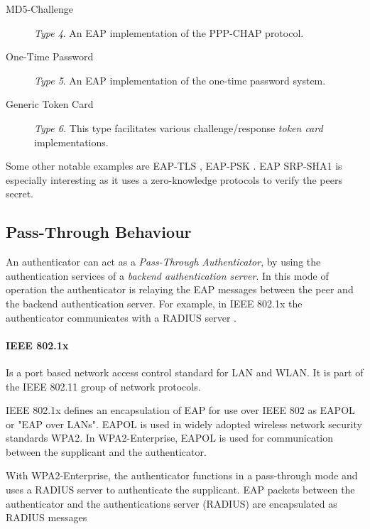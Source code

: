 \begin{description}
	\item[MD5-Challenge] \textit{Type 4}. An EAP implementation of the \cite{simon2008eap} PPP-CHAP protocol.
	\item[One-Time Password] \textit{Type 5}. An EAP implementation of the \cite{haller1998one} one-time password system.
	\item[Generic Token Card] \textit{Type 6.} This type facilitates various challenge/response \textit{token card} implementations.
\end{description}

Some other notable examples are EAP-TLS \cite{simon2008eap}, EAP-PSK \cite{bersani2007eap}.
EAP SRP-SHA1 \cite{carlson135eap} is especially interesting as it uses a zero-knowledge protocols to verify the peers secret.

\subsection{Pass-Through Behaviour}
An authenticator can act as a \textit{Pass-Through Authenticator}, by using the authentication services of a \textit{backend authentication server}.
In this mode of operation the authenticator is relaying the EAP messages between the peer and the backend authentication server.
For example, in IEEE 802.1x the authenticator communicates with a RADIUS server \cite{congdon2003ieee}.

\paragraph{IEEE 802.1x}

Is a port based network access control standard for LAN and WLAN.
It is part of the IEEE 802.11 group of network protocols.

IEEE 802.1x defines an encapsulation of EAP for use over IEEE 802 as EAPOL or "EAP over LANs".
EAPOL is used in widely adopted wireless network security standards WPA2. 
In WPA2-Enterprise, EAPOL is used for communication between the supplicant and the authenticator.

With WPA2-Enterprise, the authenticator functions in a pass-through mode and uses a RADIUS server to authenticate the supplicant.
EAP packets between the authenticator and the authentications server (RADIUS) are encapsulated as RADIUS messages \cite{aboba2003radius, chen2005extensible, congdon2003ieee}